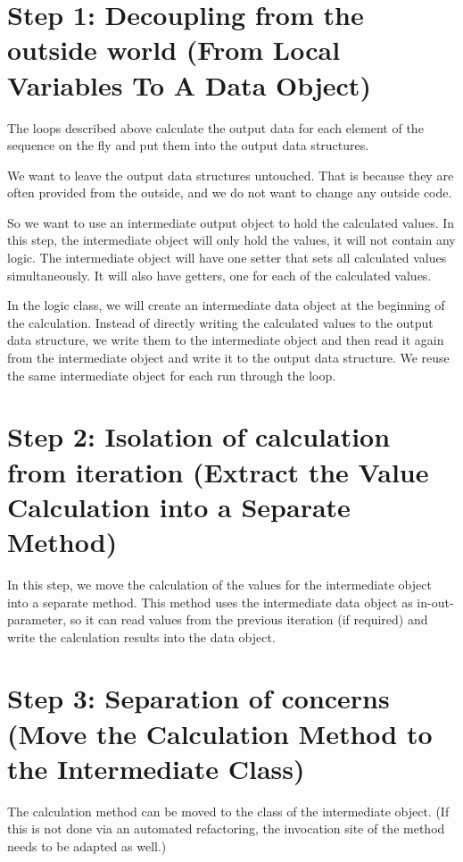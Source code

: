 \documentclass[a4paper,fleqn,titlepage,11pt]{article}
\begin{document}
\section{Step 1: Decoupling from the outside world (From Local Variables To A Data Object)}

The loops described above calculate the output data for each element of the sequence on the fly and put them into the output data structures. 

We want to leave the output data structures untouched. That is because they are often provided from the outside, and we do not want to change any outside code.

So we want to use an intermediate output object to hold the calculated values. In this step, the intermediate object will only hold the values, it will not contain any logic. The intermediate object will have one setter that sets all calculated values simultaneously. It will also have getters, one for each of the calculated values.

In the logic class, we will create an intermediate data object at the beginning of the calculation. Instead of directly writing the calculated values to the output data structure, we write them to the intermediate object and then read it again from the intermediate object and write it to the output data structure. We reuse the same intermediate object for each run through the loop.

\section{Step 2: Isolation of calculation from iteration (Extract the Value Calculation into a Separate Method)}

In this step, we move the calculation of the values for the intermediate object into a separate method. This method uses the intermediate data object as in-out-parameter, so it can read values from the previous iteration (if required) and write the calculation results into the data object.

\section{Step 3: Separation of concerns (Move the Calculation Method to the Intermediate Class)}

The calculation method can be moved to the class of the intermediate object. (If this is not done via an automated refactoring, the invocation site of the method needs to be adapted as well.)
\end{document}
